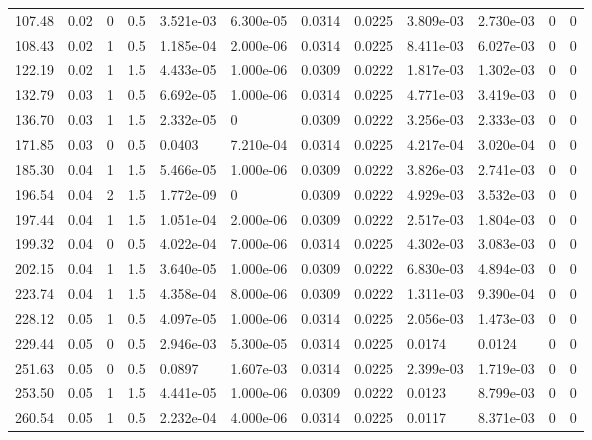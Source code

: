 \documentclass[preview]{standalone}
\begin{document}
{{\begin{tabular}{L{1.2cm}C{1.2cm} C{0.3cm}C{0.5cm} C{1.4cm}C{1.4cm} C{1.4cm}C{1.4cm} C{1.6cm}C{1.6cm} C{1.6cm}C{1.6cm}}
  107.48  &  0.02  & 0     & 0.5 &  3.521e-03  & 6.300e-05  &  0.0314&   0.0225& 3.809e-03 & 2.730e-03   &  0 & 0  \\ 
  108.43  &  0.02  & 1     & 0.5 &  1.185e-04  & 2.000e-06  &  0.0314&   0.0225& 8.411e-03 & 6.027e-03   &  0 & 0  \\ 
  122.19  &  0.02  & 1     & 1.5 &  4.433e-05  & 1.000e-06  &  0.0309&   0.0222& 1.817e-03 & 1.302e-03   &  0 & 0  \\ 
  132.79  &  0.03  & 1     & 0.5 &  6.692e-05  & 1.000e-06  &  0.0314&   0.0225& 4.771e-03 & 3.419e-03   &  0 & 0  \\ 
  136.70  &  0.03  & 1     & 1.5 &  2.332e-05  & 0  &  0.0309&   0.0222& 3.256e-03 & 2.333e-03   &  0 & 0  \\ 
  171.85  &  0.03  & 0     & 0.5 &  0.0403  & 7.210e-04  &  0.0314&   0.0225& 4.217e-04 & 3.020e-04   &  0 & 0  \\ 
  185.30  &  0.04  & 1     & 1.5 &  5.466e-05  & 1.000e-06  &  0.0309&   0.0222& 3.826e-03 & 2.741e-03   &  0 & 0  \\ 
  196.54  &  0.04  & 2     & 1.5 &  1.772e-09  & 0  &  0.0309&   0.0222& 4.929e-03 & 3.532e-03   &  0 & 0  \\ 
  197.44  &  0.04  & 1     & 1.5 &  1.051e-04  & 2.000e-06  &  0.0309&   0.0222& 2.517e-03 & 1.804e-03   &  0 & 0  \\ 
  199.32  &  0.04  & 0     & 0.5 &  4.022e-04  & 7.000e-06  &  0.0314&   0.0225& 4.302e-03 & 3.083e-03   &  0 & 0  \\ 
  202.15  &  0.04  & 1     & 1.5 &  3.640e-05  & 1.000e-06  &  0.0309&   0.0222& 6.830e-03 & 4.894e-03   &  0 & 0  \\ 
  223.74  &  0.04  & 1     & 1.5 &  4.358e-04  & 8.000e-06  &  0.0309&   0.0222& 1.311e-03 & 9.390e-04   &  0 & 0  \\ 
  228.12  &  0.05  & 1     & 0.5 &  4.097e-05  & 1.000e-06  &  0.0314&   0.0225& 2.056e-03 & 1.473e-03   &  0 & 0  \\ 
  229.44  &  0.05  & 0     & 0.5 &  2.946e-03  & 5.300e-05  &  0.0314&   0.0225& 0.0174 & 0.0124   &  0 & 0  \\ 
  251.63  &  0.05  & 0     & 0.5 &  0.0897  & 1.607e-03  &  0.0314&   0.0225& 2.399e-03 & 1.719e-03   &  0 & 0  \\ 
  253.50  &  0.05  & 1     & 1.5 &  4.441e-05  & 1.000e-06  &  0.0309&   0.0222& 0.0123 & 8.799e-03   &  0 & 0  \\ 
  260.54  &  0.05  & 1     & 0.5 &  2.232e-04  & 4.000e-06  &  0.0314&   0.0225& 0.0117 & 8.371e-03   &  0 & 0  \\ 

\end{tabular}}}
\end{document}
